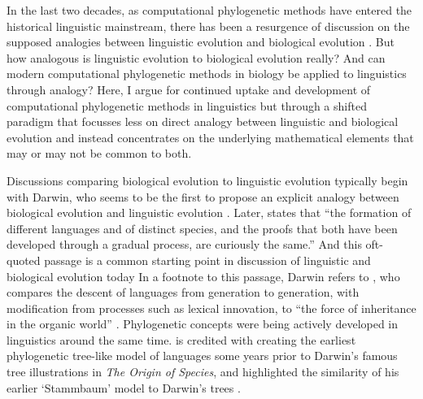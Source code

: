 In the last two decades, as computational phylogenetic methods have entered the historical linguistic mainstream, there has been a resurgence of discussion on the supposed analogies between linguistic evolution and biological evolution \autocite[e.g.][]{atkinson_curious_2005}. But how analogous is linguistic evolution to biological evolution really? And can modern computational phylogenetic methods in biology be applied to linguistics through analogy? Here, I argue for continued uptake and development of computational phylogenetic methods in linguistics but through a shifted paradigm that focusses less on direct analogy between linguistic and biological evolution and instead concentrates on the underlying mathematical elements that may or may not be common to both.

Discussions comparing biological evolution to linguistic evolution typically begin with Darwin, who seems to be the first to propose an explicit analogy between biological evolution and linguistic evolution \autocite[p.~422]{darwin_origin_1859}. Later, \textcite[p.~57]{darwin_descent_1871} states that ``the formation of different languages and of distinct species, and the proofs that both have been developed through a gradual process, are curiously the same.'' And this oft-quoted passage is a common starting point in discussion of linguistic and biological evolution today \autocites[e.g.][]{atkinson_curious_2005}{bromham_curiously_2017}{mesoudi_pursuing_2017} In a footnote to this passage, Darwin refers to \textcite[ch.~13]{lyell_geological_1863}, who compares the descent of languages from generation to generation, with modification from processes such as lexical innovation, to ``the force of inheritance in the organic world'' \autocite[p.~457]{lyell_geological_1863}. Phylogenetic concepts were being actively developed in linguistics around the same time. \textcite{schleicher_ersten_1853} is credited with creating the earliest phylogenetic tree-like model of languages some years prior to Darwin's famous tree illustrations in \emph{The Origin of Species}, and highlighted the similarity of his earlier `Stammbaum' model to Darwin's trees \autocite{schleicher_darwinsche_1863}.

